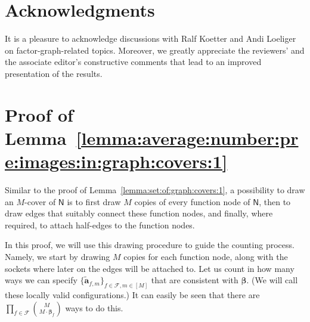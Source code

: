 \documentclass[journal, twocolumn]{IEEEtran}
\renewcommand{\mathbf}[1]{{\bm{#1}}}
\newcommand{\vect}[1]{\mathbf{#1}}
\newcommand{\set}[1]{\mathcal{#1}}
\newcommand{\graph}[1]{\mathsf{#1}}
\newcommand{\bel}{\beta}
\newcommand{\vbel}{\boldsymbol{\bel}}
\newcommand{\setF}{\set{F}}
\newcommand{\cva}{\vect{\cover{a}}}
\newcommand{\graphN}{\graph{N}}
\newcommand{\cover}[1]{\tilde{#1}}
\newcommand{\?}{\mathrm{?}}
\begin{document}
\section*{Acknowledgments}


It is a pleasure to acknowledge discussions with Ralf Koetter and Andi
Loeliger on factor-graph-related topics. Moreover, we greatly appreciate the
reviewers' and the associate editor's constructive comments that lead to an
improved presentation of the results.


\appendices


\section{Proof of Lemma~\ref{lemma:average:number:pre:images:in:graph:covers:1}}
\label{sec:proof:lemma:average:number:pre:images:in:graph:covers:1}


Similar to the proof of Lemma~\ref{lemma:set:of:graph:covers:1}, a possibility
to draw an $M$-cover of $\graphN$ is to first draw $M$ copies of every
function node of $\graphN$, then to draw edges that suitably connect these
function nodes, and finally, where required, to attach half-edges to the
function nodes.

In this proof, we will use this drawing procedure to guide the counting
process. Namely, we start by drawing $M$ copies for each function node, along
with the sockets where later on the edges will be attached to. Let us count in
how many ways we can specify $\{ \cva_{f,m} \}_{f \in \setF, m \in [M]}$ that
are consistent with $\vbel$. (We will call these locally valid
configurations.) It can easily be seen that there are $\prod_{f \in \setF} {M
  \choose M \cdot \vbel_f}$ ways to do this.
\end{document}
